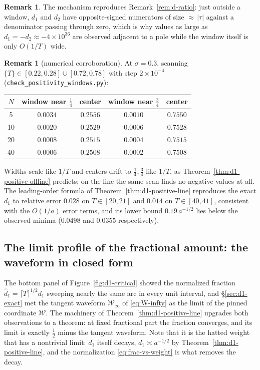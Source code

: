 \documentclass[11pt]{article}
\theoremstyle{definition}
\newtheorem{remark}[theorem]{Remark}
\begin{document}
\begin{remark}
The mechanism reproduces Remark~\ref{rem:d-ratio}: just outside a window,
$d_1$ and $d_2$ have opposite-signed numerators of size ${\approx}\,|\tau|$
against a denominator passing through zero, which is why values as large as
$d_1=-d_2\approx-4\times10^{36}$ are observed adjacent to a pole while the
window itself is only $O(1/T)$ wide.
\end{remark}

\begin{remark}[numerical corroboration]
At $\sigma=0.3$, scanning $\{T\}\in[0.22,0.28]\cup[0.72,0.78]$ with step
$2\times10^{-4}$ (\texttt{check\_positivity\_windows.py}):
\begin{center}
\begin{tabular}{ccccc}
$N$ & window near $\tfrac14$ & center & window near $\tfrac34$ & center\\
\hline
5  & $0.0034$ & $0.2556$ & $0.0010$ & $0.7550$\\
10 & $0.0020$ & $0.2529$ & $0.0006$ & $0.7528$\\
20 & $0.0008$ & $0.2515$ & $0.0004$ & $0.7515$\\
40 & $0.0006$ & $0.2508$ & $0.0002$ & $0.7508$
\end{tabular}
\end{center}
Widths scale like $1/T$ and centers drift to $\tfrac14,\tfrac34$ like
$1/T$, as Theorem~\ref{thm:d1-positive-offline} predicts; on the line the
same scan finds no negative values at all. The leading-order formula of
Theorem~\ref{thm:d1-positive-line} reproduces the exact $d_1$ to relative
error $0.028$ on $T\in[20,21]$ and $0.014$ on $T\in[40,41]$, consistent
with the $O(1/a)$ error terms, and its lower bound $0.19\,a^{-1/2}$ lies
below the observed minima ($0.0498$ and $0.0355$ respectively).
\end{remark}

\subsection{The limit profile of the fractional amount: the waveform in closed form}\label{sec:d1-limit}

The bottom panel of Figure~\ref{fig:d1-critical} showed the normalized
fraction $\hat d_1=\lceil T\rceil^{1/2}d_1$ sweeping nearly the same arc in
every unit interval, and \S\ref{sec:d1-exact} met the tangent
waveform $\mathcal{W}_{\infty}$ of \eqref{eq:W-infty} as the limit of the
pinned coordinate $\mathcal{W}$. The machinery of Theorem~\ref{thm:d1-positive-line} upgrades
both observations to a theorem: at fixed fractional part the fraction
converges, and its limit is exactly $\tfrac12$ minus the tangent waveform.
Note that it is the hatted weight that has a nontrivial limit: $d_1$ itself
decays, $d_1\asymp a^{-1/2}$ by Theorem~\ref{thm:d1-positive-line}, and the
normalization \eqref{eq:frac-vs-weight} is what removes the decay.
\end{document}
